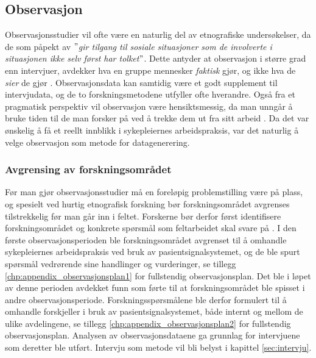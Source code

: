 \subsection{Observasjon}
\label{section:observasjon}
 
Observasjonsstudier vil ofte være en naturlig del av etnografiske undersøkelser, da de som påpekt av \citet{Tjora} \textit{$"$gir tilgang til sosiale situasjoner som de involverte i situasjonen ikke selv først har tolket$"$}. Dette antyder at observasjon i større grad enn intervjuer, avdekker hva en gruppe mennesker \textit{faktisk} gjør, og ikke hva de \textit{sier} de gjør \citep{Oates, Blomberg93, Tjora}. Observasjonsdata kan samtidig være et godt supplement til intervjudata, og de to forskningsmetodene utfyller ofte hverandre. Også fra et pragmatisk perspektiv vil observasjon være hensiktsmessig, da man unngår å bruke tiden til de man forsker på ved å trekke dem ut fra sitt arbeid \citep{Tjora}. Da det var ønskelig å få et reellt innblikk i sykepleiernes arbeidspraksis, var det naturlig å velge observasjon som metode for datagenerering.
 
\noindent
\subsubsection{Avgrensing av forskningsområdet}
Før man gjør observasjonsstudier må en foreløpig problemstilling være på plass, og spesielt ved hurtig etnografisk forskning bør forskningsområdet avgrenses tilstrekkelig før man går inn i feltet. Forskerne bør derfor først identifisere forskningsområdet og konkrete spørsmål som feltarbeidet skal svare på \citep{Tjora, Millen00}. I den første observasjonsperioden ble forskningsområdet avgrenset til å omhandle sykepleiernes arbeidspraksis ved bruk av pasientsignalsystemet, og de ble spurt spørsmål vedrørende sine handlinger og vurderinger, se tillegg \ref{chp:appendix_observasjonsplan1} for fullstendig observasjonsplan. Det ble i løpet av denne perioden avdekket funn som førte til at forskningsområdet ble spisset i andre observasjonsperiode. Forskningsspørsmålene ble derfor formulert til å omhandle forskjeller i bruk av pasientsignalsystemet, både internt og mellom de ulike avdelingene, se tillegg \ref{chp:appendix_observasjonsplan2} for fullstendig observasjonsplan. Analysen av observasjonsdataene ga grunnlag for intervjuene som deretter ble utført. Intervju som metode vil bli belyst i kapittel \ref{sec:intervju}.

